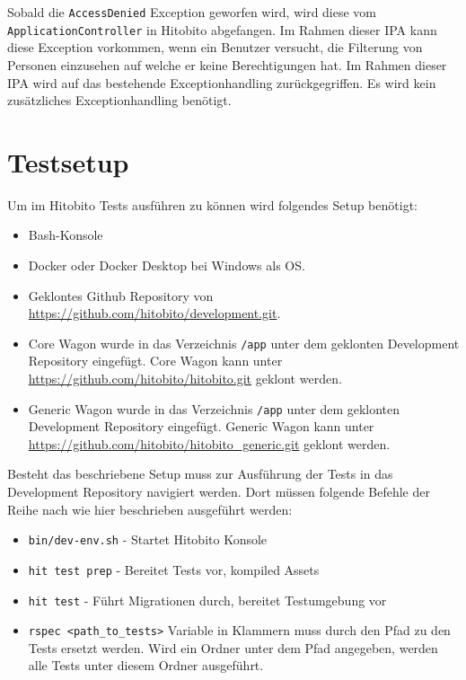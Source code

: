 Sobald die \texttt{AccessDenied} Exception geworfen wird, wird diese vom \texttt{ApplicationController}
in Hitobito abgefangen. Im Rahmen dieser IPA kann diese Exception vorkommen, wenn ein Benutzer versucht, die Filterung
von Personen einzusehen auf welche er keine Berechtigungen hat. Im Rahmen dieser IPA wird auf das bestehende Exceptionhandling zurückgegriffen.
Es wird kein zusätzliches Exceptionhandling benötigt.

\newpage

\section{Testsetup}
Um im Hitobito Tests ausführen zu können wird folgendes Setup benötigt:

\begin{itemize}
   \item Bash-Konsole
   \item Docker oder Docker Desktop bei Windows als OS. 
   \item Geklontes Github Repository von \url{https://github.com/hitobito/development.git}.
   \item Core Wagon wurde in das Verzeichnis \texttt{/app} unter dem geklonten Development Repository eingefügt. Core Wagon kann unter \url{https://github.com/hitobito/hitobito.git} geklont werden.
   \item Generic Wagon wurde in das Verzeichnis \texttt{/app} unter dem geklonten Development Repository eingefügt. Generic Wagon kann unter \url{https://github.com/hitobito/hitobito_generic.git} geklont werden.
\end{itemize}

Besteht das beschriebene Setup muss zur Ausführung der Tests in das Development Repository navigiert werden. Dort müssen folgende Befehle der Reihe nach wie hier 
beschrieben ausgeführt werden:

\label{testsetup}
\begin{itemize}
   \item \texttt{bin/dev-env.sh} - Startet Hitobito Konsole
   \item \texttt{hit test prep} - Bereitet Tests vor, kompiled Assets
   \item \texttt{hit test} - Führt Migrationen durch, bereitet Testumgebung vor
   \item \texttt{rspec <path\_to\_tests>} Variable in Klammern muss durch den Pfad zu den Tests ersetzt werden. Wird ein Ordner unter dem Pfad angegeben, werden alle Tests unter diesem Ordner ausgeführt.
\end{itemize}

